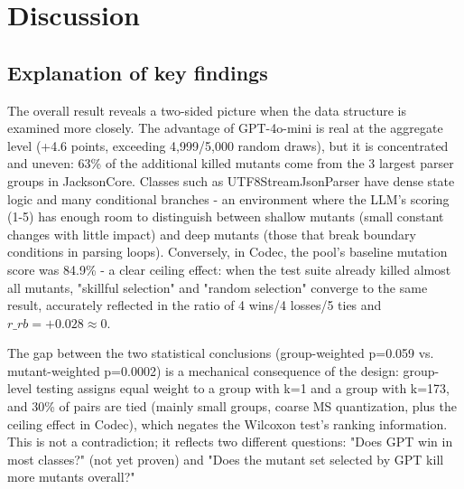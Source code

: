 \section{Discussion}
\subsection{Explanation of key findings}
The overall result reveals a two-sided picture when the data structure is examined more closely. The advantage of GPT-4o-mini is real at the aggregate level (+4.6 points, exceeding 4,999/5,000 random draws), but it is concentrated and uneven: 63\% of the additional killed mutants come from the 3 largest parser groups in JacksonCore. Classes such as UTF8StreamJsonParser have dense state logic and many conditional branches - an environment where the LLM's scoring (1-5) has enough room to distinguish between shallow mutants (small constant changes with little impact) and deep mutants (those that break boundary conditions in parsing loops). Conversely, in Codec, the pool's baseline mutation score was 84.9\% - a clear ceiling effect: when the test suite already killed almost all mutants, "skillful selection" and "random selection" converge to the same result, accurately reflected in the ratio of 4 wins/4 losses/5 ties and $r\_rb=+0.028 \approx 0$.

The gap between the two statistical conclusions (group-weighted p=0.059 vs. mutant-weighted p=0.0002) is a mechanical consequence of the design: group-level testing assigns equal weight to a group with k=1 and a group with k=173, and 30\% of pairs are tied (mainly small groups, coarse MS quantization, plus the ceiling effect in Codec), which negates the Wilcoxon test's ranking information. This is not a contradiction; it reflects two different questions: "Does GPT win in most classes?" (not yet proven) and "Does the mutant set selected by GPT kill more mutants overall?"
